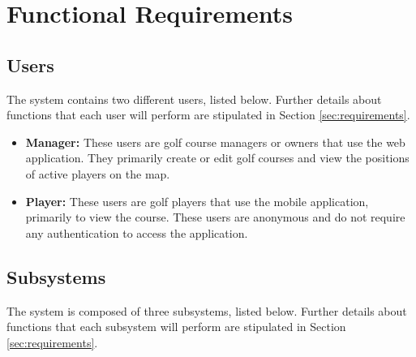 \documentclass{article}
\begin{document}
    \newpage


    \section{Functional Requirements} 

    \subsection{Users}

    The system contains two different users, listed below. Further details
    about functions that each user will perform are stipulated in Section
    \ref{sec:requirements}.

    \begin{itemize}
        \item \textbf{Manager:} These users are golf course managers or owners
            that use the web application. They primarily create or edit golf
            courses and view the positions of active players on the map.
        \item \textbf{Player:} These users are golf players that use the mobile
            application, primarily to view the course. These users are
            anonymous and do not require any authentication to access the
            application.
    \end{itemize}

    \subsection{Subsystems}

    The system is composed of three subsystems, listed below. Further details
    about functions that each subsystem will perform are stipulated in Section
    \ref{sec:requirements}.
\end{document}
